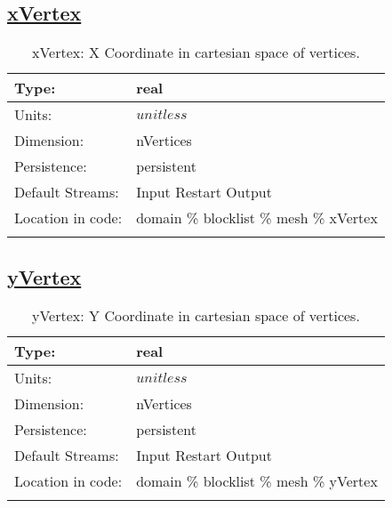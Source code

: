 \subsection[xVertex]{\hyperref[sec:var_tab_mesh]{xVertex}}
\label{subsec:var_sec_mesh_xVertex}
\begin{center}
\begin{longtable}{| p{2.0in} | p{4.0in} |}
        \hline 
        Type: & real \\
        \hline 
        Units: & $unitless$ \\
        \hline 
        Dimension: & nVertices \\
        \hline 
        Persistence: & persistent \\
        \hline 
		 Default Streams: & Input Restart Output  \\
        \hline 
		 Location in code: & domain \% blocklist \% mesh \% xVertex \\
		 \hline 
    \caption{xVertex: X Coordinate in cartesian space of vertices.}
\end{longtable}
\end{center}
\subsection[yVertex]{\hyperref[sec:var_tab_mesh]{yVertex}}
\label{subsec:var_sec_mesh_yVertex}
\begin{center}
\begin{longtable}{| p{2.0in} | p{4.0in} |}
        \hline 
        Type: & real \\
        \hline 
        Units: & $unitless$ \\
        \hline 
        Dimension: & nVertices \\
        \hline 
        Persistence: & persistent \\
        \hline 
		 Default Streams: & Input Restart Output  \\
        \hline 
		 Location in code: & domain \% blocklist \% mesh \% yVertex \\
		 \hline 
    \caption{yVertex: Y Coordinate in cartesian space of vertices.}
\end{longtable}
\end{center}
